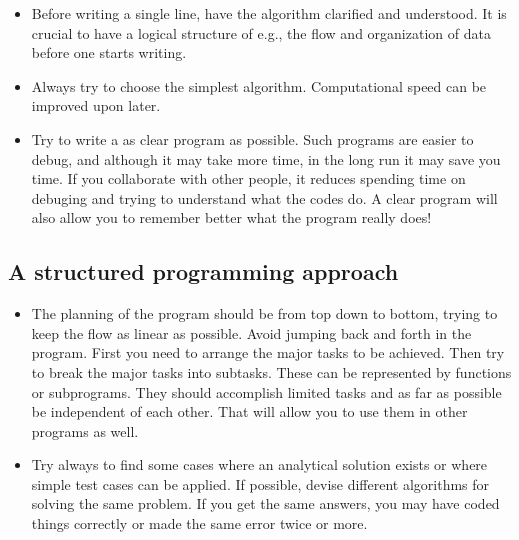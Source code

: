 \documentclass[%
twoside,                 %
final,                   %
10pt]{article}
\newenvironment{block_mdfboxadmon}[1][]{
\begin{block_mdfboxmdframed}[frametitle=#1]
}
{
\end{block_mdfboxmdframed}
}
\begin{document}
\begin{block_mdfboxadmon}[]

\begin{itemize}
  \item Before writing a single line, have the algorithm clarified and understood. It is crucial to have a logical structure of e.g., the flow and organization of data before one starts writing.

  \item Always try to choose the simplest algorithm. Computational speed can be improved upon later.

  \item Try to write a as clear program as possible. Such programs are easier to debug, and although it may take more time, in the long run it may save you time. If you collaborate with other people, it reduces spending time on debuging and trying to understand what the codes do. A clear program will also allow you to remember better what the program really does!
\end{itemize}

\noindent
\end{block_mdfboxadmon}



\subsection{A structured programming approach}

\begin{block_mdfboxadmon}[]

\begin{itemize}
  \item The planning of the program should be from top down to bottom, trying to keep the flow as linear as possible. Avoid jumping back and forth in the program. First you need to arrange the major tasks to be achieved. Then try to break the major tasks into subtasks. These can be represented by functions or subprograms. They should accomplish limited tasks and as far as possible be independent of each other. That will allow you to use them in other programs as well.

  \item Try always to find some cases where an analytical solution exists or where simple test cases can be applied. If possible, devise different algorithms for solving the same problem. If you get the same answers, you may have coded things correctly or made the same error twice or more.
\end{itemize}

\noindent
\end{block_mdfboxadmon}
\end{document}
